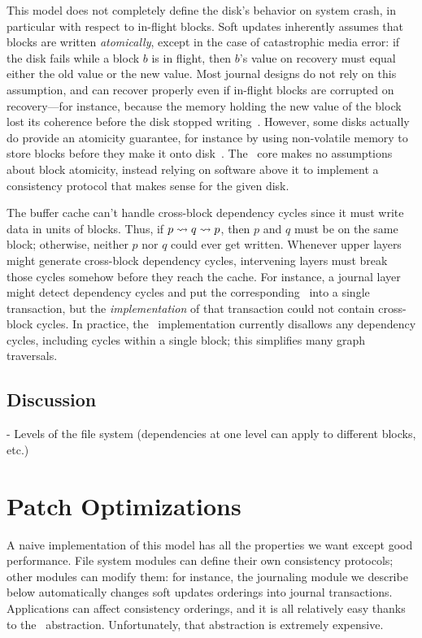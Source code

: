 This model does not completely define the disk's behavior on system crash,
 in particular with respect to in-flight blocks.
%
Soft updates inherently assumes that blocks are written
\emph{atomically}, except in the case of catastrophic media error:
%
if the disk fails while a block $b$ is in flight, then $b$'s
value on recovery must equal either the old value or the new value.
%
Most journal designs do not rely on this assumption, and can recover
 properly even if in-flight blocks are corrupted on recovery---for instance,
 because the memory holding the new value of the block lost its coherence
 before the disk stopped writing~\cite{tso}.
%
However, some disks actually do provide an atomicity guarantee, for
 instance by using non-volatile memory to store blocks before they make it
 onto disk~\cite{???}.
%
The \Kudos\ core makes no assumptions about block atomicity, instead relying
 on software above it to implement a consistency protocol that makes sense
 for the given disk.


The buffer cache can't handle cross-block dependency cycles since it must
write data in units of blocks.
%
Thus, if $p \leadsto q \leadsto p$, then $p$ and $q$ must be on the same
block; otherwise, neither $p$ nor $q$ could ever get written.
%
Whenever upper layers might generate cross-block dependency cycles,
intervening layers must break those cycles somehow before they reach the
cache.
%
For instance, a journal layer might detect dependency cycles and put the
corresponding \patches\ into a single transaction, but the
\emph{implementation} of that transaction could not contain cross-block
cycles.
%
In practice, the \Kudos\ implementation currently disallows any dependency
cycles, including cycles within a single block; this simplifies many graph
traversals.





\subsection{Discussion}

- Levels of the file system (dependencies at one level can apply to
  different blocks, etc.)



\section{Patch Optimizations}
\label{sec:patch:optimizations}

A naive implementation of this model has all the properties we want except
good performance.
%
File system modules can define their own consistency protocols; other
modules can modify them: for instance, the journaling module we describe
below automatically changes soft updates orderings into journal
transactions.
%
Applications can affect consistency orderings, and it is all relatively
easy thanks to the \patch\ abstraction.
%
Unfortunately, that abstraction is extremely expensive.



